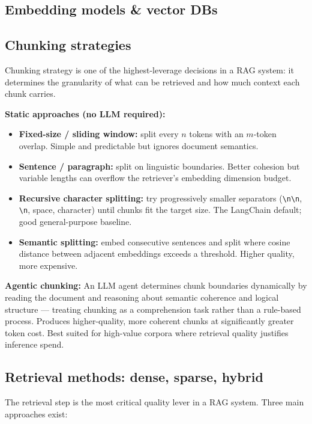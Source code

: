 \subsection{Embedding models \& vector DBs}


\subsection{Chunking strategies}
\label{chunking}

Chunking strategy is one of the highest-leverage decisions in a RAG system: it
determines the granularity of what can be retrieved and how much context each chunk
carries.

\textbf{Static approaches (no LLM required):}
\begin{itemize}
  \item \textbf{Fixed-size / sliding window:} split every $n$ tokens with an $m$-token
    overlap. Simple and predictable but ignores document semantics.
  \item \textbf{Sentence / paragraph:} split on linguistic boundaries. Better cohesion
    but variable lengths can overflow the retriever's embedding dimension budget.
  \item \textbf{Recursive character splitting:} try progressively smaller separators
    (\verb|\n\n|, \verb|\n|, space, character) until chunks fit the target size.
    The LangChain default; good general-purpose baseline.
  \item \textbf{Semantic splitting:} embed consecutive sentences and split where
    cosine distance between adjacent embeddings exceeds a threshold. Higher quality,
    more expensive.
\end{itemize}

\textbf{Agentic chunking:}
An LLM agent determines chunk boundaries dynamically by reading the document and
reasoning about semantic coherence and logical structure — treating chunking as a
comprehension task rather than a rule-based process. Produces higher-quality, more
coherent chunks at significantly greater token cost. Best suited for high-value
corpora where retrieval quality justifies inference spend.

\subsection{Retrieval methods: dense, sparse, hybrid}

The retrieval step is the most critical quality lever in a RAG system. Three main
approaches exist:

